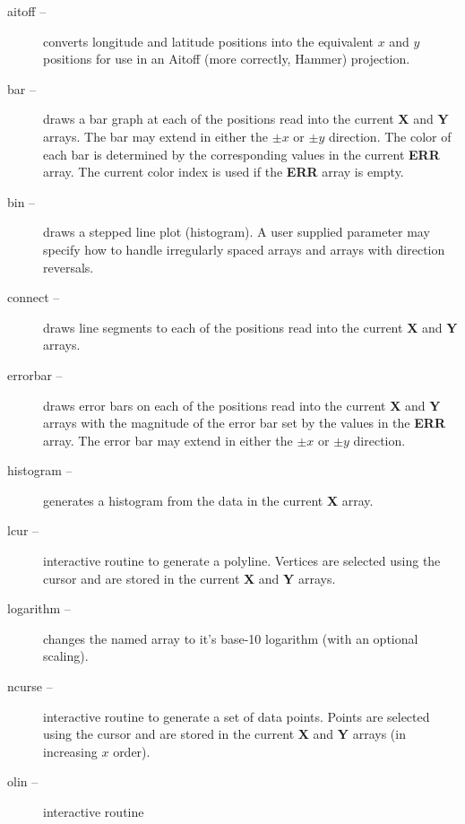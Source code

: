 \begin{description}
  \item [{aitoff --}] converts longitude
    and latitude positions into the equivalent $x$ and $y$ positions
    for use in an Aitoff (more correctly, Hammer) projection.
  \item [{bar --}] draws a bar graph
    at each of the positions read into the current {\bf X} and
    {\bf Y} arrays.
    The bar may extend in either the $\pm x$ or $\pm y$ direction.
    The color of each bar is determined by the corresponding values
    in the current {\bf ERR} array.
    The current color index is used if the {\bf ERR} array is empty.
  \item [{bin --}] draws a stepped
    line plot (histogram).
    A user supplied parameter may specify how to handle irregularly spaced
    arrays and arrays with direction reversals.
  \item [{connect --}] draws line
    segments to each of the positions read into the current {\bf X} and
    {\bf Y} arrays.
  \item [{errorbar --}] draws error
    bars on each of the positions read into the current {\bf X} and
    {\bf Y} arrays with the magnitude of the error bar set by the values
    in the {\bf ERR} array.
    The error bar may extend in either the $\pm x$ or $\pm y$ direction.
  \item [{histogram --}] generates
    a histogram from the data in the current {\bf X} array.
  \item [{lcur --}] interactive routine
    to generate a polyline.
    Vertices are selected using the cursor and are stored in
    the current {\bf X} and {\bf Y} arrays.
  \item [{logarithm --}] changes the
    named array to it's base-10 logarithm (with an optional scaling).
  \item [{ncurse --}] interactive routine
    to generate a set of data points.
    Points are selected using the cursor and are
    stored in the current {\bf X} and {\bf Y} arrays (in increasing $x$ order).
  \item [{olin --}] interactive routine

\end{description}
